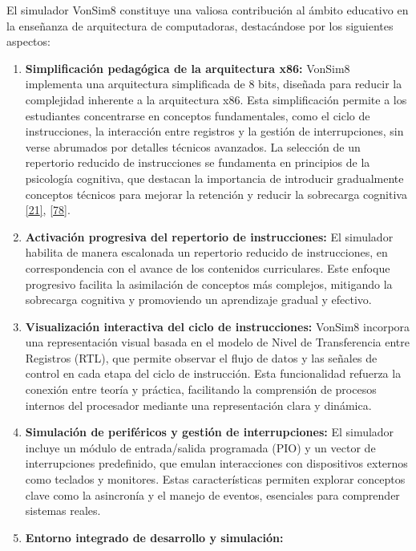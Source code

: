 \documentclass[12pt,oneside]{templates/unerthesis}
\begin{document}
El simulador VonSim8 constituye una valiosa contribución al ámbito educativo en la enseñanza de arquitectura de computadoras, destacándose por los siguientes aspectos:

\begin{enumerate}
\def\labelenumi{\arabic{enumi}.}
\item
  \textbf{Simplificación pedagógica de la arquitectura x86:}
  VonSim8 implementa una arquitectura simplificada de 8 bits, diseñada para reducir la complejidad inherente a la arquitectura x86. Esta simplificación permite a los estudiantes concentrarse en conceptos fundamentales, como el ciclo de instrucciones, la interacción entre registros y la gestión de interrupciones, sin verse abrumados por detalles técnicos avanzados. La selección de un repertorio reducido de instrucciones se fundamenta en principios de la psicología cognitiva, que destacan la importancia de introducir gradualmente conceptos técnicos para mejorar la retención y reducir la sobrecarga cognitiva \protect\hyperlink{ref-sweller2010cognitive}{{[}21{]}}, \protect\hyperlink{ref-nationalacademies2018how}{{[}78{]}}.
\item
  \textbf{Activación progresiva del repertorio de instrucciones:}
  El simulador habilita de manera escalonada un repertorio reducido de instrucciones, en correspondencia con el avance de los contenidos curriculares. Este enfoque progresivo facilita la asimilación de conceptos más complejos, mitigando la sobrecarga cognitiva y promoviendo un aprendizaje gradual y efectivo.
\item
  \textbf{Visualización interactiva del ciclo de instrucciones:}
  VonSim8 incorpora una representación visual basada en el modelo de Nivel de Transferencia entre Registros (RTL), que permite observar el flujo de datos y las señales de control en cada etapa del ciclo de instrucción. Esta funcionalidad refuerza la conexión entre teoría y práctica, facilitando la comprensión de procesos internos del procesador mediante una representación clara y dinámica.
\item
  \textbf{Simulación de periféricos y gestión de interrupciones:}
  El simulador incluye un módulo de entrada/salida programada (PIO) y un vector de interrupciones predefinido, que emulan interacciones con dispositivos externos como teclados y monitores. Estas características permiten explorar conceptos clave como la asincronía y el manejo de eventos, esenciales para comprender sistemas reales.
\item
  \textbf{Entorno integrado de desarrollo y simulación:}

\end{enumerate}
\end{document}
